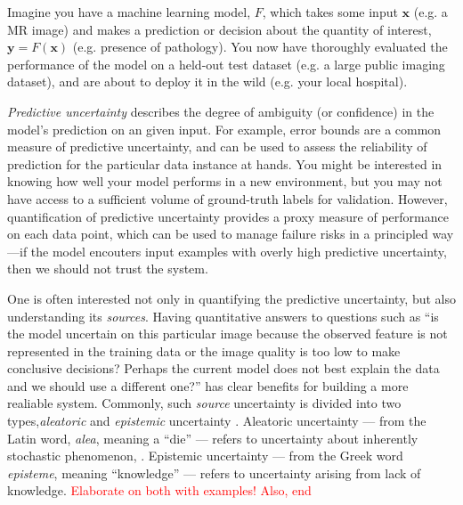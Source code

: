 Imagine you have a machine learning model, $F$, which takes some input $\mathbf{x}$  (e.g. a MR image) and makes a prediction or decision about the quantity of interest, $\mathbf{y}=F(\mathbf{x})$ (e.g. presence of pathology). %
You now have thoroughly evaluated the performance of the model on a held-out test dataset (e.g. a large public imaging dataset), and are about to deploy it in the wild (e.g. your local hospital). 

\textit{Predictive uncertainty} describes the degree of ambiguity (or confidence) in the model's prediction on an given input. For example, error bounds are a common measure of predictive uncertainty, and can be used to assess the reliability of prediction for the particular data instance at hands. You might be interested in knowing how well your model performs in a new environment, but you may not have access to a sufficient volume of ground-truth labels for validation. However, quantification of predictive uncertainty provides a proxy measure of performance on each data point, which can be used to manage failure risks in a principled way---if the model encouters input examples with overly high predictive uncertainty, then we should not trust the system. 

One is often interested not only in quantifying the predictive uncertainty, but also understanding its \textit{sources}. Having quantitative answers to questions such as ``is the model uncertain on this particular image because the observed feature is not represented in the training data or the image quality is too low to make conclusive decisions? Perhaps the current model does not best explain the data and we should use a different one?'' has clear benefits for building a more realiable system. Commonly, such \textit{source} uncertainty is divided into two types,\textit{aleatoric} and \textit{epistemic} uncertainty \cite{hora1996aleatory}. Aleatoric uncertainty --- from the Latin word, \textit{alea}, meaning a ``die'' --- refers to uncertainty about inherently stochastic phenomenon, . Epistemic uncertainty — from the Greek word \textit{episteme}, meaning “knowledge” — refers to uncertainty arising from lack of knowledge. \textcolor{red}{Elaborate on both with examples! Also, end }

